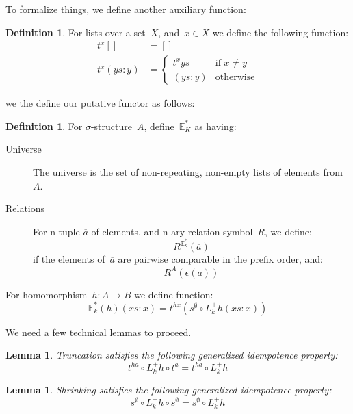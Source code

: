 \documentclass{article}
\theoremstyle{plain}
\newtheorem{lemma}[theorem]{Lemma}
\theoremstyle{definition}
\newtheorem{definition}[theorem]{Definition}
\theoremstyle{remark}
\numberwithin{theorem}{section}
\begin{document}
To formalize things, we define another auxiliary function:
\begin{definition}
For lists over a set~$X$, and~$x \in X$ we define the following function:
\begin{align*}
    t^x [] &= []\\
    t^x (ys:y) &=
    \begin{cases}
    t^x ys &\mbox{if } x \neq y\\
    (ys:y) &\mbox{otherwise}
    \end{cases}
\end{align*}
\end{definition}
we the define our putative functor as follows:
\begin{definition}
For $\sigma$-structure~$A$, define~$\mathbb{E}^*_K$ as having:
\begin{description}
\item[Universe] The universe is the set of non-repeating, non-empty lists of elements from~$A$.
\item[Relations] For n-tuple $\overline{a}$ of elements, and n-ary relation symbol~$R$, we define:
\begin{equation*}
    R^{\mathbb{E}^*_k}(\overline{a})
\end{equation*}
if the elements of~$\overline{a}$ are pairwise comparable in the prefix order, and:
\begin{equation*}
    R^A(\epsilon(\overline{a}))
\end{equation*}
\end{description}
For homomorphism~$h : A \rightarrow B$ we define function:
\begin{equation*}
    \mathbb{E}^*_k(h)(xs:x) = t^{h x}(s^\emptyset \circ L^+_k h (xs:x))
\end{equation*}
\end{definition}
We need a few technical lemmas to proceed.
\begin{lemma}
Truncation satisfies the following generalized idempotence property:
\begin{equation*}
t^{h a} \circ L^+_k h \circ t^a = t^{h a} \circ L^+_k h
\end{equation*}
\end{lemma}
\begin{lemma}
Shrinking satisfies the following generalized idempotence property:
\begin{equation*}
    s^\emptyset \circ L^+_k h \circ s^\emptyset = s^\emptyset \circ L^+_k h
\end{equation*}
\end{lemma}
\end{document}
